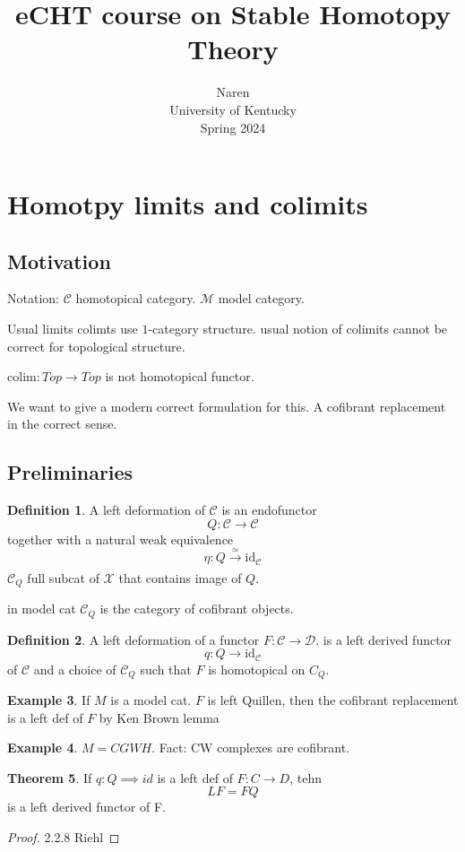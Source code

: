 \documentclass[notitlepage, 12pt]{article}
\date{}
\makeatletter
\theoremstyle{definition}
\newtheorem{theorem}{Theorem}[section]
\newtheorem{definition}[theorem]{Definition}
\newtheorem{example}[theorem]{Example}
\theoremstyle{para}
\newcommand*{\toccontents}{\@starttoc{toc}}
\makeatother
\begin{document}
\begin{titlepage}
    \title{eCHT course on Stable Homotopy Theory
}
\author{\normalsize Naren\\
\normalsize University of Kentucky\\
\normalsize Spring 2024}
	\maketitle
	\thispagestyle{empty}
    	\toccontents
\end{titlepage}
\pagebreak
{}
\section{Homotpy limits and colimits }
\subsection{Motivation}
Notation: $\mathcal{C}$ homotopical category. $\mathcal{M}$ model category. 

Usual limits colimts use $1$-category structure. usual notion of colimits cannot be correct for topological structure. 

$\mathrm{colim } : Top \to Top$ is not homotopical functor. 

We want to give a modern correct formulation for this. A cofibrant replacement in the correct sense. 

\subsection{Preliminaries}
\begin{definition}
    A left deformation of $\mathcal{C}$ is an endofunctor 
    \[
         Q: \mathcal{C}\to \mathcal{C}
    \] together with a natural weak equivalence  
    \[
         \eta: Q \xrightarrow[ ]{\simeq }\mathrm{ id }_\mathcal{C}
    \]
    $\mathcal{C}_{Q}$ full subcat of $\mathcal{X}$ that contains image of $Q$. 
\end{definition}
in model cat $\mathcal{C}_ Q$ is the category of cofibrant objects. 

\begin{definition}
    A left deformation of a functor $F: \mathcal{C} \to \mathcal{D}$. is a left derived functor $$q: Q\to \mathrm{id }_ \mathcal{C}$$ of $\mathcal{C}$ and a choice of $\mathcal{C}_Q$ such that $F$ is homotopical on $C_Q$. 
\end{definition}
\begin{example}
    If $M$ is a model cat. $F$ is left Quillen, then the cofibrant replacement is a left def of $F$ by Ken Brown lemma 
\end{example}
\begin{example}
    $M=CGWH$. 
    Fact: CW complexes are cofibrant. 
\end{example}
\begin{theorem}
     If $q: Q\implies id $ is a left def of $F: C\to D$, tehn 
     \[
         LF= FQ 
     \]is a left derived functor of F. 
\end{theorem}
\begin{proof}
     2.2.8 Riehl 
\end{proof}
\end{document}
